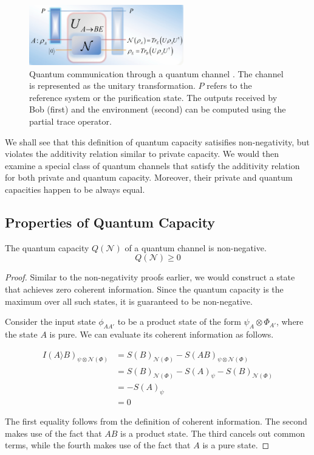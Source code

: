 \begin{figure}[H]
    \centering
    \includegraphics[width=0.6\textwidth]{figures/quantum_communication_quantum_channel.png}
    \caption{Quantum communication through a quantum channel \cite{Gyongyosi_2018}. The channel is represented as the unitary transformation. $P$ refers to the reference system or the purification state. The outputs received by Bob (first) and the environment (second) can be computed using the partial trace operator.}
\end{figure}

We shall see that this definition of quantum capacity satisifies non-negativity, but violates the additivity relation similar to private capacity. We would then examine a special class of quantum channels that satisfy the additivity relation for both private and quantum capacity. Moreover, their private and quantum capacities happen to be always equal.

\subsection{Properties of Quantum Capacity}

\begin{theorem}
The quantum capacity $Q(\mathcal{N})$ of a quantum channel is non-negative.
$$Q(\mathcal{N}) \geq 0$$
\end{theorem}

\begin{proof}
Similar to the non-negativity proofs earlier, we would construct a state that achieves zero coherent information. Since the quantum capacity is the maximum over all such states, it is guaranteed to be non-negative.

Consider the input state $\phi_{AA'}$ to be a product state of the form $\psi_A \otimes \Phi_{A'}$, where the state $A$ is pure. We can evaluate its coherent information as follows.

\begin{align*}
I(A \rangle B)_{\psi \otimes \mathcal{N}(\Phi)} &= S(B)_{\mathcal{N}(\Phi)} - S(AB)_{\psi \otimes \mathcal{N}(\Phi)} \\
&= S(B)_{\mathcal{N}(\Phi)} - S(A)_{\psi} - S(B)_{\mathcal{N}(\Phi)} \\
&= - S(A)_{\psi} \\
&= 0
\end{align*}

The first equality follows from the definition of coherent information. The second makes use of the fact that $AB$ is a product state. The third cancels out common terms, while the fourth makes use of the fact that $A$ is a pure state.
\end{proof}

